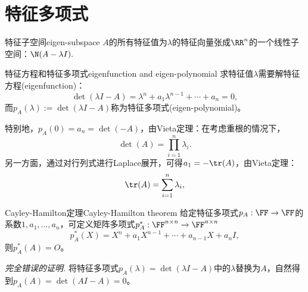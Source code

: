 \section{特征多项式}

\begin{definition}{特征子空间}{eigen-subspace}
	$A$的所有特征值为$\lambda$的特征向量张成$\RR^n$的一个线性子空间：$\N(A-\lambda I).$
\end{definition}


\begin{definition}
	{特征方程和特征多项式}{eigenfunction and eigen-polynomial}
	求特征值$\lambda$需要解特征方程(eigenfunction)：
	\[
		\det(\lambda I-A)=\lambda^n+a_1\lambda^{n-1}+\cdots+a_n=0,
	\]
	而$p_A(\lambda):=\det(\lambda I-A)$称为特征多项式(eigen-polynomial)。
\end{definition}

\begin{corollary}
	特别地，$p_A(0)=a_n=\det(-A)$，由Vieta定理：在考虑重根的情况下，
	\begin{equation}
		\label{eqn:det lambda}
		\det(A)=\prod_{i=1}^n\lambda_i.
	\end{equation}
	另一方面，通过对行列式进行Laplace展开，可得$a_1=-\tr(A)$，由Vieta定理：
	\begin{equation}
		\label{eqn:trace lambda}
		\tr(A)=\sum_{i=1}^n\lambda_i,
	\end{equation}
\end{corollary}


\begin{theorem}
	{Cayley-Hamilton定理}{Cayley-Hamilton theorem}
	给定特征多项式$p_A:\FF\to\FF$的系数$1,a_1,\ldots,a_n$，可定义矩阵多项式$p_A^*:\FF^{n\times n}\to\FF^{n\times n}$
	\begin{equation}
		p_A^*(X)=X^n+a_1X^{n-1}+\cdots+a_{n-1}X+a_nI,
	\end{equation}
	则$p_A^*(A)=O$。
\end{theorem}

\noindent
\textit{完全错误的证明.}
将特征多项式$p_A(\lambda)=\det(\lambda I-A)$中的$\lambda$替换为$A$，自然得到$p_A(A)=\det(AI-A)=0$。


